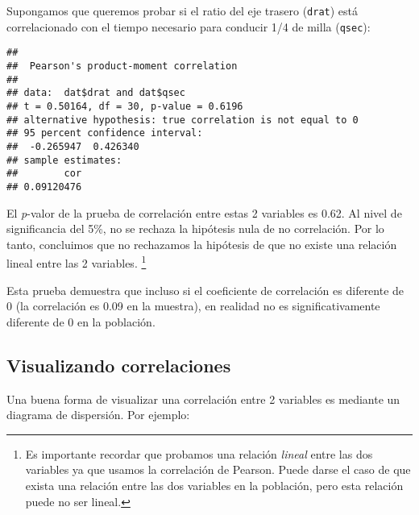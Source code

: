 \documentclass[
]{book}
\newenvironment{Shaded}{\begin{snugshade}}{\end{snugshade}}
\newcommand{\CommentTok}[1]{\textcolor[rgb]{0.56,0.35,0.01}{\textit{#1}}}
\newcommand{\KeywordTok}[1]{\textcolor[rgb]{0.13,0.29,0.53}{\textbf{#1}}}
\newcommand{\NormalTok}[1]{#1}
\newcommand{\OperatorTok}[1]{\textcolor[rgb]{0.81,0.36,0.00}{\textbf{#1}}}
\newcommand{\StringTok}[1]{\textcolor[rgb]{0.31,0.60,0.02}{#1}}
\begin{document}
Supongamos que queremos probar si el ratio del eje trasero (\texttt{drat}) está correlacionado con el tiempo necesario para conducir 1/4 de milla (\texttt{qsec}):

\begin{Shaded}
\end{Shaded}

\begin{verbatim}
## 
## 	Pearson's product-moment correlation
## 
## data:  dat$drat and dat$qsec
## t = 0.50164, df = 30, p-value = 0.6196
## alternative hypothesis: true correlation is not equal to 0
## 95 percent confidence interval:
##  -0.265947  0.426340
## sample estimates:
##        cor 
## 0.09120476
\end{verbatim}

El \emph{p}-valor de la prueba de correlación entre estas 2 variables es 0.62. Al nivel de significancia del 5\%, no se rechaza la hipótesis nula de no correlación. Por lo tanto, concluimos que no rechazamos la hipótesis de que no existe una relación lineal entre las 2 variables. \footnote{Es importante recordar que probamos una relación \emph{lineal} entre las dos variables ya que usamos la correlación de Pearson. Puede darse el caso de que exista una relación entre las dos variables en la población, pero esta relación puede no ser lineal.}

Esta prueba demuestra que incluso si el coeficiente de correlación es diferente de 0 (la correlación es 0.09 en la muestra), en realidad no es significativamente diferente de 0 en la población.

\hypertarget{visualizando-correlaciones}{%
\subsection{Visualizando correlaciones}\label{visualizando-correlaciones}}

Una buena forma de visualizar una correlación entre 2 variables es mediante un diagrama de dispersión. Por ejemplo:

\begin{Shaded}
\end{Shaded}
\end{document}
